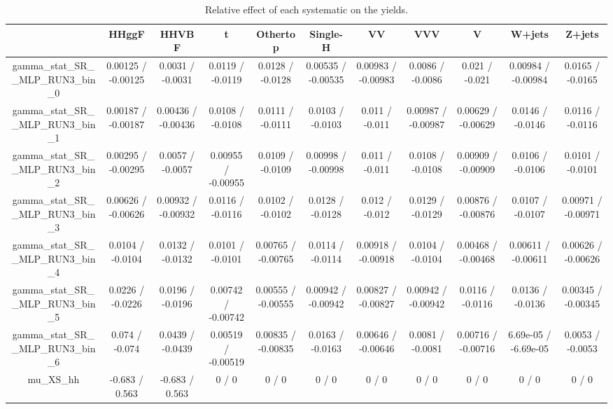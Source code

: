 \documentclass[10pt]{article}
\begin{document}
\begin{table}[htbp]
\begin{center}
\begin{tabular}{|c|c|c|c|c|c|c|c|c|c|c|}
\hline 
      & HHggF      & HHVBF      & t      & Othertop      & Single-H      & VV      & VVV      & V      & W+jets      & Z+jets \\ 
\hline 
  gamma_stat_SR__MLP_RUN3_bin_0 & 0.00125 / -0.00125 & 0.0031 / -0.0031 & 0.0119 / -0.0119 & 0.0128 / -0.0128 & 0.00535 / -0.00535 & 0.00983 / -0.00983 & 0.0086 / -0.0086 & 0.021 / -0.021 & 0.00984 / -0.00984 & 0.0165 / -0.0165 \\ 
  gamma_stat_SR__MLP_RUN3_bin_1 & 0.00187 / -0.00187 & 0.00436 / -0.00436 & 0.0108 / -0.0108 & 0.0111 / -0.0111 & 0.0103 / -0.0103 & 0.011 / -0.011 & 0.00987 / -0.00987 & 0.00629 / -0.00629 & 0.0146 / -0.0146 & 0.0116 / -0.0116 \\ 
  gamma_stat_SR__MLP_RUN3_bin_2 & 0.00295 / -0.00295 & 0.0057 / -0.0057 & 0.00955 / -0.00955 & 0.0109 / -0.0109 & 0.00998 / -0.00998 & 0.011 / -0.011 & 0.0108 / -0.0108 & 0.00909 / -0.00909 & 0.0106 / -0.0106 & 0.0101 / -0.0101 \\ 
  gamma_stat_SR__MLP_RUN3_bin_3 & 0.00626 / -0.00626 & 0.00932 / -0.00932 & 0.0116 / -0.0116 & 0.0102 / -0.0102 & 0.0128 / -0.0128 & 0.012 / -0.012 & 0.0129 / -0.0129 & 0.00876 / -0.00876 & 0.0107 / -0.0107 & 0.00971 / -0.00971 \\ 
  gamma_stat_SR__MLP_RUN3_bin_4 & 0.0104 / -0.0104 & 0.0132 / -0.0132 & 0.0101 / -0.0101 & 0.00765 / -0.00765 & 0.0114 / -0.0114 & 0.00918 / -0.00918 & 0.0104 / -0.0104 & 0.00468 / -0.00468 & 0.00611 / -0.00611 & 0.00626 / -0.00626 \\ 
  gamma_stat_SR__MLP_RUN3_bin_5 & 0.0226 / -0.0226 & 0.0196 / -0.0196 & 0.00742 / -0.00742 & 0.00555 / -0.00555 & 0.00942 / -0.00942 & 0.00827 / -0.00827 & 0.00942 / -0.00942 & 0.0116 / -0.0116 & 0.0136 / -0.0136 & 0.00345 / -0.00345 \\ 
  gamma_stat_SR__MLP_RUN3_bin_6 & 0.074 / -0.074 & 0.0439 / -0.0439 & 0.00519 / -0.00519 & 0.00835 / -0.00835 & 0.0163 / -0.0163 & 0.00646 / -0.00646 & 0.0081 / -0.0081 & 0.00716 / -0.00716 & 6.69e-05 / -6.69e-05 & 0.0053 / -0.0053 \\ 
  mu_XS_hh & -0.683 / 0.563 & -0.683 / 0.563 & 0 / 0 & 0 / 0 & 0 / 0 & 0 / 0 & 0 / 0 & 0 / 0 & 0 / 0 & 0 / 0 \\ 
\hline 
\end{tabular} 
\caption{Relative effect of each systematic on the yields.} 
\end{center} 
\end{table} 
\end{document}
